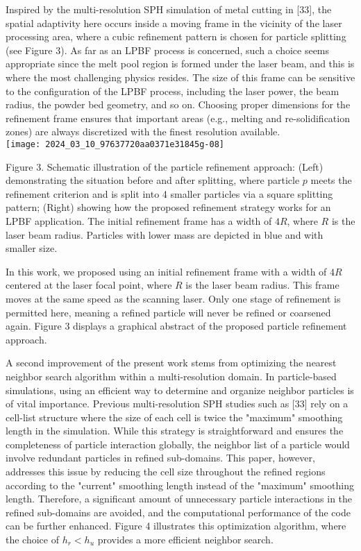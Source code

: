 \documentclass[10pt]{article}
\begin{document}
Inspired by the multi-resolution SPH simulation of metal cutting in [33], the spatial adaptivity here occurs inside a moving frame in the vicinity of the laser processing area, where a cubic refinement pattern is chosen for particle splitting (see Figure 3). As far as an LPBF process is concerned, such a choice seems appropriate since the melt pool region is formed under the laser beam, and this is where the most challenging physics resides. The size of this frame can be sensitive to the configuration of the LPBF process, including the laser power, the beam radius, the powder bed geometry, and so on. Choosing proper dimensions for the refinement frame ensures that important areas (e.g., melting and re-solidification zones) are always discretized with the finest resolution available.\\
\texttt{[image: 2024\_03\_10\_97637720aa0371e31845g-08]}

Figure 3. Schematic illustration of the particle refinement approach: (Left) demonstrating the situation before and after splitting, where particle $p$ meets the refinement criterion and is split into 4 smaller particles via a square splitting pattern; (Right) showing how the proposed refinement strategy works for an LPBF application. The initial refinement frame has a width of $4 R$, where $R$ is the laser beam radius. Particles with lower mass are depicted in blue and with smaller size.

In this work, we proposed using an initial refinement frame with a width of $4 R$ centered at the laser focal point, where $R$ is the laser beam radius. This frame moves at the same speed as the scanning laser. Only one stage of refinement is permitted here, meaning a refined particle will never be refined or coarsened again. Figure 3 displays a graphical abstract of the proposed particle refinement approach.

A second improvement of the present work stems from optimizing the nearest neighbor search algorithm within a multi-resolution domain. In particle-based simulations, using an efficient way to determine and organize neighbor particles is of vital importance. Previous multi-resolution SPH studies such as [33] rely on a cell-list structure where the size of each cell is twice the "maximum" smoothing length in the simulation. While this strategy is straightforward and ensures the completeness of particle interaction globally, the neighbor list of a particle would involve redundant particles in refined sub-domains. This paper, however, addresses this issue by reducing the cell size throughout the refined regions according to the "current" smoothing length instead of the "maximum" smoothing length. Therefore, a significant amount of unnecessary particle interactions in the refined sub-domains are avoided, and the computational performance of the code can be further enhanced. Figure 4 illustrates this optimization algorithm, where the choice of $h_{r}<h_{u}$ provides a more efficient neighbor search.
\end{document}
